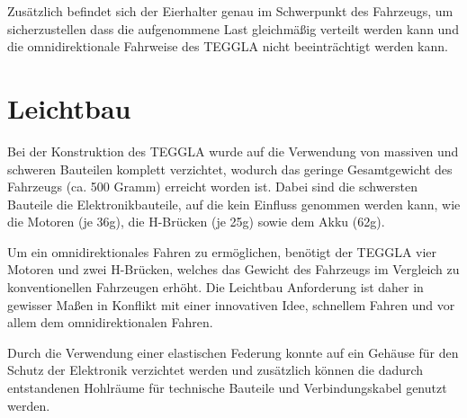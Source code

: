 Zusätzlich befindet sich der Eierhalter genau im Schwerpunkt des Fahrzeugs, um sicherzustellen dass die aufgenommene Last gleichmäßig verteilt werden kann und die omnidirektionale Fahrweise des TEGGLA nicht beeinträchtigt werden kann.



\section{Leichtbau}	

Bei der Konstruktion des TEGGLA wurde auf die Verwendung von massiven und schweren Bauteilen komplett verzichtet, wodurch das geringe Gesamtgewicht des Fahrzeugs (ca. 500 Gramm) erreicht worden ist. 
Dabei sind die schwersten Bauteile die Elektronikbauteile, auf die kein Einfluss genommen werden kann, wie die Motoren (je 36g), die H-Brücken (je 25g) sowie dem Akku (62g). 

Um ein omnidirektionales Fahren zu ermöglichen, benötigt der TEGGLA vier Motoren und zwei H-Brücken, welches das Gewicht des Fahrzeugs im Vergleich zu konventionellen Fahrzeugen erhöht. 
Die Leichtbau Anforderung ist daher in gewisser Maßen in Konflikt mit einer innovativen Idee, schnellem Fahren und vor allem dem omnidirektionalen Fahren. 

Durch die Verwendung einer elastischen Federung konnte auf ein Gehäuse für den Schutz der Elektronik verzichtet werden und zusätzlich können die dadurch entstandenen Hohlräume für technische Bauteile und Verbindungskabel genutzt werden.    
